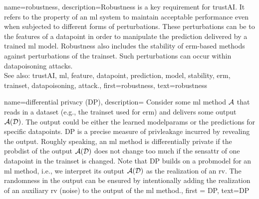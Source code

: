 {name={robustness},
	description={Robustness is a key requirement for \gls{trustAI}. It
		refers to the property of an \gls{ml} system to maintain acceptable performance even when 
		subjected to different forms of perturbations. These perturbations can be to the \glspl{feature} 
		of a \gls{datapoint} in order to manipulate the \gls{prediction} delivered by a trained \gls{ml} \gls{model}. 
		Robustness also includes the \gls{stability} of \gls{erm}-based methods against perturbations 
		of the \gls{trainset}. Such perturbations can occur within \gls{datapoisoning} \glspl{attack}. 
		\\ 
		See also: \gls{trustAI}, \gls{ml}, \gls{feature}, \gls{datapoint}, \gls{prediction}, \gls{model}, \gls{stability}, \gls{erm}, \gls{trainset}, \gls{datapoisoning}, \gls{attack}.}, 
	first={robustness}, 
	text={robustness} 
}

{name=differential privacy (DP),
  description={
  	Consider some \gls{ml} method $\mathcal{A}$ that reads in a \gls{dataset} (e.g., the \gls{trainset} 
  	used for \gls{erm}) and delivers some output $\mathcal{A}(\mathcal{D})$. The output 
  	could be either the learned \gls{modelparams} or the \gls{prediction}s for specific \gls{datapoint}s. 
  	DP is a precise measure of \gls{privleakage} incurred by revealing the 
  	output. Roughly speaking, an \gls{ml} method is differentially private if the \gls{probdist} 
  	of the output $\mathcal{A}(\mathcal{D})$ does not change too much if the \gls{sensattr} 
  	of one \gls{datapoint} in the \gls{trainset} is changed. Note that DP 
  	builds on a \gls{probmodel} for an \gls{ml} method, i.e., we interpret its output $\mathcal{A}(\mathcal{D})$ 
  	as the \gls{realization} of an \gls{rv}. The randomness in the output can be ensured 
  	by intentionally adding the \gls{realization} of an auxiliary \gls{rv} (noise) to 
  	the output of the \gls{ml} method.}, 
	first = {DP}, text={DP} 
}

